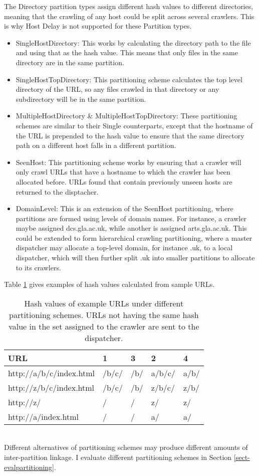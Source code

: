The Directory partition types assign different hash values to different directories, meaning that the crawling of any host could be split across several crawlers. This is why Host Delay is not supported for these Partition types.
\begin{itemize}
\item{SingleHostDirectory:}
This works by calculating the directory path to the file and using that as the hash value. This means that only files in the same directory are in the same partition.
\item{SingleHostTopDirectory:}
This partitioning scheme calculates the top level directory of the URL, so any files crawled in that directory or any subdirectory will be in the same partition.
\item{MultipleHostDirectory \& MultipleHostTopDirectory:}
These partitioning schemes are similar to their Single counterparts, except that the hostname of the URL is prepended to the hash value to ensure that the same directory path on a different host falls in a different partition.
\item{SeenHost:} This partitioning scheme works by ensuring that a crawler will only crawl URLs that have a hostname to which the crawler has been allocated before. URLs found that contain previously unseen hosts are returned to the disptacher.
\item{DomainLevel:} This is an extension of the SeenHost partitioning, where partitions are formed using levels of domain names. For instance, a crawler maybe assigned dcs.gla.ac.uk, while another is assigned arts.gla.ac.uk. This could be extended to form hierarchical crawling partitioning\cite{ref3}, where a master dispatcher may allocate a top-level domain, for instance .uk, to a local dispatcher, which will then further split .uk into smaller partitions to allocate to its crawlers.
\end{itemize}
Table \ref{tbl-partitionsex} gives examples of hash values calculated from sample URLs.
\begin{table}
\begin{center}
\begin{tabular}{|l|l|l|l|l|}
\hline
\bf{URL} & \bf{1} & \bf{3} & \bf{2} & \bf{4} \\
\hline
http://a/b/c/index.html & /b/c/ & /b/ & a/b/c/ & a/b/ \\
\hline
http://z/b/c/index.html & /b/c/ & /b/ & z/b/c/ & z/b/ \\
\hline
http://z/ & / & / & z/ & z/ \\
\hline
http://a/index.html & / & / & a/ & a/ \\
\hline
\end{tabular}
\caption{Hash values of example URLs under different partitioning schemes. URLs not having the same hash value in the set assigned to the crawler are sent to the dispatcher.}\label{tbl-partitionsex}
\end{center}
\end{table}
\ \\
Different alternatives of partitioning schemes may produce different amounts of inter-partition linkage. I evaluate different partitioning schemes in Section \ref{sect-evalpartitioning}.

